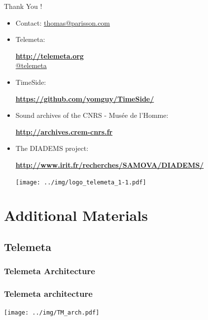 \documentclass[final, hyperref, table]{beamer}
\begin{document}
\begin{frame}{Thank You !}
  \begin{itemize}
  \item Contact: \url{thomas@parisson.com}
  \item Telemeta:
    \begin{center}
      \colorbox{yellow!40}{\textbf{\url{http://telemeta.org}}}\\
      \colorbox{yellow!40}{\href{https://twitter.com/telemeta/}{@telemeta}}
    \end{center}

  \item TimeSide:
    \begin{center}
      \colorbox{yellow!40}{\bf
        \url{https://github.com/yomguy/TimeSide/}}
    \end{center}

  \item Sound archives of the CNRS - Musée de l’Homme:
    \begin{center}
      \colorbox{yellow!40}{\bf\url{http://archives.crem-cnrs.fr}}
    \end{center}

  \item The DIADEMS project:
    \begin{center}
      \colorbox{yellow!40}{\bf
        \url{http://www.irit.fr/recherches/SAMOVA/DIADEMS/}}
    \end{center}

    \begin{center}
    \texttt{[image: ../img/logo\_telemeta\_1-1.pdf]}
    \end{center}
  \end{itemize}

\end{frame}

\appendix
\section{Additional Materials}
\subsection{Telemeta}
\subsubsection{Telemeta Architecture}
\begin{frame}\frametitle{Telemeta architecture}
  \begin{center}
    \texttt{[image: ../img/TM\_arch.pdf]}
  \end{center}
\end{frame}
\end{document}

